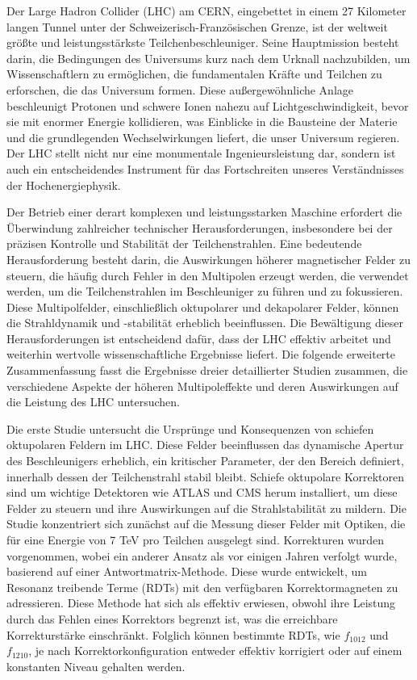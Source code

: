 {
\fontsize{12pt}{17pt}\selectfont

Der Large Hadron Collider (LHC) am CERN, eingebettet in einem 27 Kilometer langen Tunnel unter der Schweizerisch-Französischen Grenze, ist der weltweit größte und leistungsstärkste Teilchenbeschleuniger. Seine Hauptmission besteht darin, die Bedingungen des Universums kurz nach dem Urknall nachzubilden, um Wissenschaftlern zu ermöglichen, die fundamentalen Kräfte und Teilchen zu erforschen, die das Universum formen. Diese außergewöhnliche Anlage beschleunigt Protonen und schwere Ionen nahezu auf Lichtgeschwindigkeit, bevor sie mit enormer Energie kollidieren, was Einblicke in die Bausteine der Materie und die grundlegenden Wechselwirkungen liefert, die unser Universum regieren. Der LHC stellt nicht nur eine monumentale Ingenieursleistung dar, sondern ist auch ein entscheidendes Instrument für das Fortschreiten unseres Verständnisses der Hochenergiephysik.

Der Betrieb einer derart komplexen und leistungsstarken Maschine erfordert die Überwindung zahlreicher technischer Herausforderungen, insbesondere bei der präzisen Kontrolle und Stabilität der Teilchenstrahlen. Eine bedeutende Herausforderung besteht darin, die Auswirkungen höherer magnetischer Felder zu steuern, die häufig durch Fehler in den Multipolen erzeugt werden, die verwendet werden, um die Teilchenstrahlen im Beschleuniger zu führen und zu fokussieren. Diese Multipolfelder, einschließlich oktupolarer und dekapolarer Felder, können die Strahldynamik und -stabilität erheblich beeinflussen. Die Bewältigung dieser Herausforderungen ist entscheidend dafür, dass der LHC effektiv arbeitet und weiterhin wertvolle wissenschaftliche Ergebnisse liefert. Die folgende erweiterte Zusammenfassung fasst die Ergebnisse dreier detaillierter Studien zusammen, die verschiedene Aspekte der höheren Multipoleffekte und deren Auswirkungen auf die Leistung des LHC untersuchen.

 Die erste Studie untersucht die Ursprünge und Konsequenzen von schiefen oktupolaren Feldern im LHC. Diese Felder beeinflussen das dynamische Apertur des Beschleunigers erheblich, ein kritischer Parameter, der den Bereich definiert, innerhalb dessen der Teilchenstrahl stabil bleibt. Schiefe oktupolare Korrektoren sind um wichtige Detektoren wie ATLAS und CMS herum installiert, um diese Felder zu steuern und ihre Auswirkungen auf die Strahlstabilität zu mildern. Die Studie konzentriert sich zunächst auf die Messung dieser Felder mit Optiken, die für eine Energie von 7 TeV pro Teilchen ausgelegt sind. Korrekturen wurden vorgenommen, wobei ein anderer Ansatz als vor einigen Jahren verfolgt wurde, basierend auf einer Antwortmatrix-Methode. Diese wurde entwickelt, um Resonanz treibende Terme (RDTs) mit den verfügbaren Korrektormagneten zu adressieren. Diese Methode hat sich als effektiv erwiesen, obwohl ihre Leistung durch das Fehlen eines Korrektors begrenzt ist, was die erreichbare Korrekturstärke einschränkt. Folglich können bestimmte RDTs, wie $f_{1012}$ und $f_{1210}$, je nach Korrektorkonfiguration entweder effektiv korrigiert oder auf einem konstanten Niveau gehalten werden.

}
